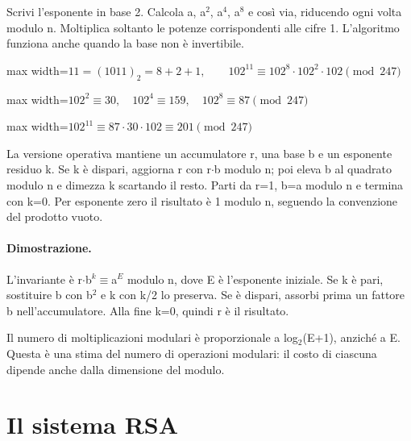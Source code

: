 \documentclass[a4paper,11pt]{article}
\begin{document}
Scrivi l’esponente in base 2. Calcola a, a$^{2}$, a$^{4}$, a$^{8}$ e così via, riducendo ogni volta modulo n. Moltiplica soltanto le potenze corrispondenti alle cifre 1. L’algoritmo funziona anche quando la base non è invertibile.

\begin{center}\begin{adjustbox}{max width=\linewidth}$\displaystyle 11=(1011)_2=8+2+1,\qquad102^{11}\equiv102^8\cdot102^2\cdot102\pmod{247}$\end{adjustbox}\end{center}

\begin{center}\begin{adjustbox}{max width=\linewidth}$\displaystyle 102^2\equiv30,\quad102^4\equiv159,\quad102^8\equiv87\pmod{247}$\end{adjustbox}\end{center}

\begin{center}\begin{adjustbox}{max width=\linewidth}$\displaystyle 102^{11}\equiv87\cdot30\cdot102\equiv201\pmod{247}$\end{adjustbox}\end{center}

La versione operativa mantiene un accumulatore r, una base b e un esponente residuo k. Se k è dispari, aggiorna r con r$\cdot$b modulo n; poi eleva b al quadrato modulo n e dimezza k scartando il resto. Parti da r=1, b=a modulo n e termina con k=0. Per esponente zero il risultato è 1 modulo n, seguendo la convenzione del prodotto vuoto.

\paragraph{Dimostrazione.} L’invariante è r$\cdot$b$^{k}$$\equiv$a$^{E}$ modulo n, dove E è l’esponente iniziale. Se k è pari, sostituire b con b$^{2}$ e k con k/2 lo preserva. Se è dispari, assorbi prima un fattore b nell’accumulatore. Alla fine k=0, quindi r è il risultato.

Il numero di moltiplicazioni modulari è proporzionale a log$_{2}$(E+1), anziché a E. Questa è una stima del numero di operazioni modulari: il costo di ciascuna dipende anche dalla dimensione del modulo.

\section{Il sistema RSA}
\end{document}
